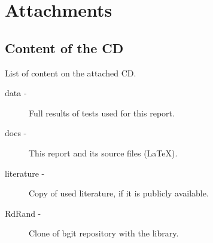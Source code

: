 \chapter{Attachments}\label{chap:attachments}
\section{Content of the CD}
List of content on the attached CD.

\begin{description}
  \item[data -] Full results of tests used for this report.
  \item[docs -] This report and its source files (LaTeX).
  \item[literature -] Copy of used literature, if it is publicly available.
  \item[RdRand -] Clone of bgit repository with the library.
\end{description}



